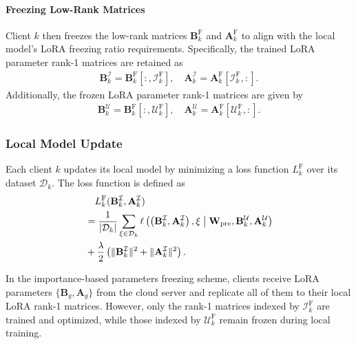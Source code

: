 \documentclass[journal]{IEEEtran}
\begin{document}
\paragraph{Freezing Low-Rank Matrices}  
Client \(k\) then freezes the low-rank matrices \(\mathbf{B}_k^{\text{F}}\) and \(\mathbf{A}_k^{\text{F}}\) to align with the local model's LoRA freezing ratio requirements. Specifically, the trained LoRA parameter rank-1 matrices are retained as 
\begin{equation}
\label{B_IkA_Ik}
\begin{aligned}
\mathbf{B}_k^{\mathcal{I}} = \mathbf{B}_k^{\text{F}}[:, \mathcal{I}_k^{\text{F}}], \quad \mathbf{A}_k^{\mathcal{I}} = \mathbf{A}_k^{\text{F}}[\mathcal{I}_k^{\text{F}}, :].
\end{aligned}
\end{equation}  
Additionally, the frozen LoRA parameter rank-1 matrices are given by  
\begin{equation}
\begin{aligned}
\mathbf{B}_k^{\mathcal{U}} = \mathbf{B}_k^{\text{F}}[:, \mathcal{U}_k^{\text{F}}], \quad \mathbf{A}_k^{\mathcal{U}} = \mathbf{A}_k^{\text{F}}[\mathcal{U}_k^{\text{F}}, :].
\end{aligned}
\end{equation}  

\subsubsection{Local Model Update}
Each client \(k\) updates its local model by minimizing a loss function \(L_k^{\text{F}}\) over its dataset \(\mathcal{D}_k\). The loss function is defined as
\begin{align}
&\quad L_k^{\text{F}}(\mathbf{B}_k^{\mathcal{I}}, \mathbf{A}_k^{\mathcal{I}}) \notag \\
&= \frac{1}{|\mathcal{D}_k|} \sum_{\xi \in \mathcal{D}_k} 
\ell\left(\left(\mathbf{B}_{k}^{\mathcal{I}}, \mathbf{A}_{k}^{\mathcal{I}}\right), \xi
\;\middle|\;
\mathbf{W}_{\text{pre}}, \mathbf{B}_{k}^{\mathcal{U}}, \mathbf{A}_{k}^{\mathcal{U}}\right) \notag\\
&+\frac{\lambda}{2} \left( \|\mathbf{B}_{k}^{\mathcal{I}}\|^2 + \|\mathbf{A}_{k}^{\mathcal{I}}\|^2 \right).
\end{align}

In the importance-based parameters freezing scheme, clients receive LoRA parameters \(\{\mathbf{B}_g, \mathbf{A}_g\}\) from the cloud server and replicate all of them to their local LoRA rank-1 matrices. However, only the rank-1 matrices indexed by \(\mathcal{I}_k^{\text{F}}\) are trained and optimized, while those indexed by \(\mathcal{U}_k^{\text{F}}\) remain frozen during local training. 
\end{document}
